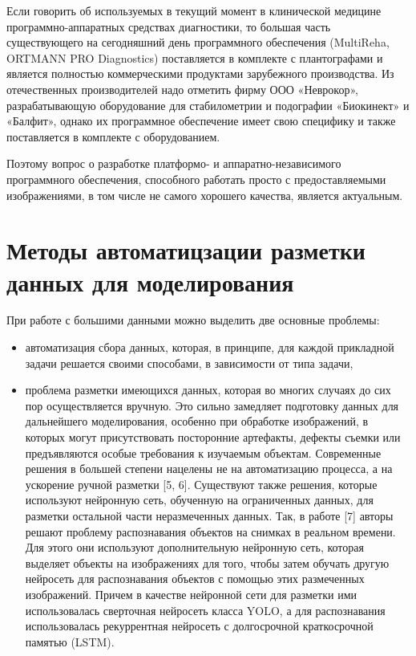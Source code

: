 \documentclass[coursework]{SCWorks}
\begin{document}
Если говорить об используемых в текущий момент в клинической медицине программно-аппаратных средствах диагностики, то большая часть существующего на сегодняшний день программного обеспечения (MultiReha, ORTMANN PRO Diagnostics) поставляется в комплекте с плантографами и является полностью коммерческими продуктами зарубежного производства. Из отечественных производителей надо отметить фирму ООО «Неврокор», разрабатывающую оборудование для стабилометрии и подографии «Биокинект» и «Балфит», однако их программное обеспечение имеет свою специфику и также поставляется в комплекте с оборудованием.

Поэтому вопрос о разработке платформо- и аппаратно-независимого программного обеспечения, способного работать просто с предоставляемыми изображениями, в том числе не самого хорошего качества, является актуальным.


\section{Методы автоматицзации разметки данных для моделирования}
При работе с большими данными можно выделить две основные проблемы:
\begin{itemize}
    \item автоматизация сбора данных, которая, в принципе, для каждой прикладной задачи решается своими способами, в зависимости от типа задачи,
    \item проблема разметки имеющихся данных, которая во многих случаях до сих пор осуществляется вручную. Это сильно замедляет подготовку данных для дальнейшего моделирования, особенно при обработке изображений, в которых могут присутствовать посторонние артефакты, дефекты съемки или предъявляются особые требования к изучаемым объектам. Современные решения в большей степени нацелены не на автоматизацию процесса, а на ускорение ручной разметки [5, 6]. Существуют также решения, которые используют нейронную сеть, обученную на ограниченных данных, для разметки остальной части неразмеченных данных. Так, в работе [7] авторы решают проблему распознавания объектов на снимках в реальном времени. Для этого они используют дополнительную нейронную сеть, которая выделяет объекты на изображениях для того, чтобы затем обучать другую нейросеть для распознавания объектов с помощью этих размеченных изображений. Причем в качестве нейронной сети для разметки ими использовалась сверточная нейросеть класса YOLO, а для распознавания использовалась рекуррентная нейросеть с долгосрочной краткосрочной памятью (LSTM).
\end{itemize}
\end{document}
